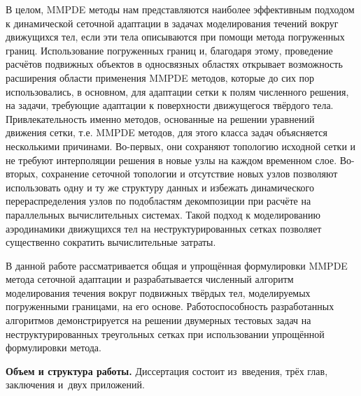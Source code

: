 	В целом, MMPDE методы нам представляются наиболее эффективным подходом к динамической сеточной адаптации в задачах моделирования течений вокруг движущихся тел, если эти тела описываются при помощи метода погруженных границ. Использование погруженных границ и, благодаря этому, проведение расчётов подвижных объектов в односвязных областях открывает возможность расширения области применения MMPDE методов, которые до сих пор использовались, в основном, для адаптации сетки к полям численного решения, на задачи, требующие адаптации к поверхности движущегося твёрдого тела. Привлекательность именно методов, основанные на решении уравнений движения сетки, т.е. MMPDE методов, для этого класса задач объясняется несколькими причинами. Во-первых, они сохраняют топологию исходной сетки и не требуют интерполяции решения в новые узлы на каждом временном слое. Во-вторых, сохранение сеточной топологии и отсутствие новых узлов позволяют использовать одну и ту же структуру данных и избежать динамического перераспределения узлов по подобластям декомпозиции при расчёте на параллельных вычислительных системах. Такой подход к моделированию аэродинамики движущихся тел на неструктурированных сетках позволяет существенно сократить вычислительные затраты.
	
	В данной работе рассматривается общая и упрощённая формулировки MMPDE метода сеточной адаптации и разрабатывается численный алгоритм моделирования течения вокруг подвижных твёрдых тел, моделируемых погруженными границами, на его основе. Работоспособность разработанных алгоритмов демонстрируется на решении двумерных тестовых задач на неструктурированных треугольных сетках при использовании упрощённой формулировки метода.

\newcommand{\actuality}{}
\newcommand{\progress}{}
\newcommand{\aim}{{\textbf\aimTXT}}
\newcommand{\tasks}{\textbf{\tasksTXT}}
\newcommand{\novelty}{\textbf{\noveltyTXT}}
\newcommand{\influence}{\textbf{\influenceTXT}}
\newcommand{\methods}{\textbf{\methodsTXT}}
\newcommand{\defpositions}{\textbf{\defpositionsTXT}}
\newcommand{\reliability}{\textbf{\reliabilityTXT}}
\newcommand{\probation}{\textbf{\probationTXT}}
\newcommand{\contribution}{\textbf{\contributionTXT}}
\newcommand{\publications}{\textbf{\publicationsTXT}}


\textbf{Объем и структура работы.} Диссертация состоит из~введения, трёх глав,
заключения и~двух приложений.




